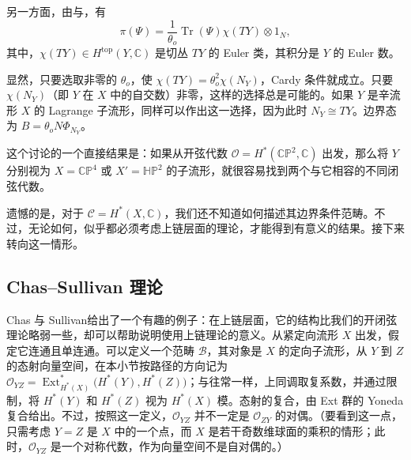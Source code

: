 另一方面，由与，有
\begin{equation}\label{eq:2.73}
\pi(\Psi)=\frac{1}{\theta_o}\operatorname{Tr}(\Psi)\chi(TY)\otimes1_N,
\end{equation}
其中，$\chi(TY)\in H^{\mathrm{top}}(Y,\mathbb{C})$ 是切丛 $TY$ 的 Euler 类，其积分是 $Y$ 的 Euler 数。

显然，只要选取非零的 $\theta_o$，使 $\chi(TY)=\theta_o^2\chi(N_Y)$，Cardy 条件就成立。只要 $\chi(N_Y)$（即 $Y$ 在 $X$ 中的自交数）非零，这样的选择总是可能的。如果 $Y$ 是辛流形 $X$ 的 Lagrange 子流形，同样可以作出这一选择，因为此时 $N_Y\cong TY$。边界态为 $B=\theta_oN\Phi_{N_Y}$。

这个讨论的一个直接结果是：如果从开弦代数 $\mathcal{O}=H^*(\mathbb{CP}^2,\mathbb{C})$ 出发，那么将 $Y$ 分别视为 $X=\mathbb{CP}^4$ 或 $X'=\mathbb{HP}^2$ 的子流形，就很容易找到两个与它相容的不同闭弦代数。

遗憾的是，对于 $\mathcal{C}=H^*(X,\mathbb{C})$，我们还不知道如何描述其边界条件范畴。不过，无论如何，似乎都必须考虑上链层面的理论，才能得到有意义的结果。接下来转向这一情形。

\subsection{Chas--Sullivan 理论}\label{sec:2.5.2}

Chas 与 Sullivan给出了一个有趣的例子：在上链层面，它的结构比我们的开闭弦理论略弱一些，却可以帮助说明使用上链理论的意义。从紧定向流形 $X$ 出发，假定它连通且单连通。可以定义一个范畴 $\mathcal{B}$，其对象是 $X$ 的定向子流形，从 $Y$ 到 $Z$ 的态射向量空间，在本小节按路径的方向记为 $\mathcal{O}_{YZ}=\operatorname{Ext}_{H^*(X)}^*\bigl(H^*(Y),H^*(Z)\bigr)$；与往常一样，上同调取复系数，并通过限制，将 $H^*(Y)$ 和 $H^*(Z)$ 视为 $H^*(X)$ 模。态射的复合，由 Ext 群的 Yoneda 复合给出。不过，按照这一定义，$\mathcal{O}_{YZ}$ 并不一定是 $\mathcal{O}_{ZY}$ 的对偶。（要看到这一点，只需考虑 $Y=Z$ 是 $X$ 中的一个点，而 $X$ 是若干奇数维球面的乘积的情形；此时，$\mathcal{O}_{YZ}$ 是一个对称代数，作为向量空间不是自对偶的。）

